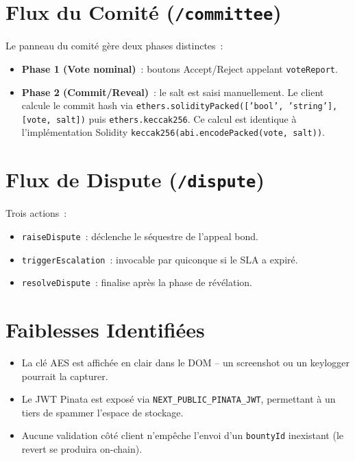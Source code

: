 \documentclass[12pt, a4paper]{report}
\begin{document}
\section{Flux du Comit\'{e} (\texttt{/committee})}
Le panneau du comit\'{e} g\`{e}re deux phases distinctes~:
\begin{itemize}
    \item \textbf{Phase 1 (Vote nominal)}~: boutons Accept/Reject appelant \texttt{voteReport}.
    \item \textbf{Phase 2 (Commit/Reveal)}~: le salt est saisi manuellement. Le client calcule le commit hash via \texttt{ethers.solidityPacked(['bool', 'string'], [vote, salt])} puis \texttt{ethers.keccak256}. Ce calcul est identique \`{a} l'impl\'{e}mentation Solidity \texttt{keccak256(abi.encodePacked(vote, salt))}.
\end{itemize}

\section{Flux de Dispute (\texttt{/dispute})}
Trois actions~:
\begin{itemize}
    \item \texttt{raiseDispute}~: d\'{e}clenche le s\'{e}questre de l'appeal bond.
    \item \texttt{triggerEscalation}~: invocable par quiconque si le SLA a expir\'{e}.
    \item \texttt{resolveDispute}~: finalise apr\`{e}s la phase de r\'{e}v\'{e}lation.
\end{itemize}

\section{Faiblesses Identifi\'{e}es}
\begin{itemize}
    \item La cl\'{e} AES est affich\'{e}e en clair dans le DOM -- un screenshot ou un keylogger pourrait la capturer.
    \item Le JWT Pinata est expos\'{e} via \texttt{NEXT\_PUBLIC\_PINATA\_JWT}, permettant \`{a} un tiers de spammer l'espace de stockage.
    \item Aucune validation c\^{o}t\'{e} client n'emp\^{e}che l'envoi d'un \texttt{bountyId} inexistant (le revert se produira on-chain).
\end{itemize}

\end{document}
